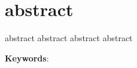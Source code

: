 \chapter*{abstract}

\noindent  abstract abstract abstract abstract 

\noindent
\textbf{Keywords}: \enUSKeyword

